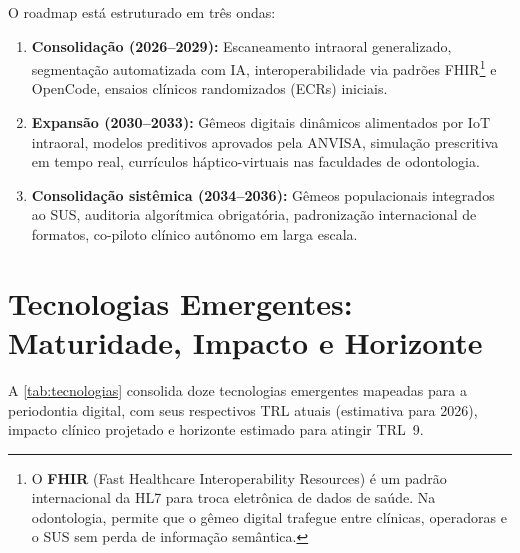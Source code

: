 O roadmap está estruturado em três ondas:
\begin{enumerate}[label=\textbf{Onda \arabic*:}, leftmargin=*]
    \item \textbf{Consolidação (2026--2029):} Escaneamento intraoral
        generalizado, segmentação automatizada com IA,
        interoperabilidade via padrões FHIR\footnote{O
        \textbf{FHIR} (Fast Healthcare Interoperability Resources)
        é um padrão internacional da HL7 para troca eletrônica de
        dados de saúde. Na odontologia, permite que o gêmeo digital
        trafegue entre clínicas, operadoras e o SUS sem perda de
        informação semântica.} e OpenCode, ensaios clínicos
        randomizados (ECRs) iniciais.
    \item \textbf{Expansão (2030--2033):} Gêmeos digitais dinâmicos
        alimentados por IoT intraoral, modelos preditivos
        aprovados pela ANVISA, simulação prescritiva em tempo
        real, currículos háptico-virtuais nas faculdades de
        odontologia.
    \item \textbf{Consolidação sistêmica (2034--2036):} Gêmeos
        populacionais integrados ao SUS, auditoria algorítmica
        obrigatória, padronização internacional de formatos,
        co-piloto clínico autônomo em larga escala.
\end{enumerate}


\section{Tecnologias Emergentes: Maturidade, Impacto e Horizonte}

A \autoref{tab:tecnologias} consolida doze tecnologias emergentes
mapeadas para a periodontia digital, com seus respectivos TRL
atuais (estimativa para 2026), impacto clínico projetado e
horizonte estimado para atingir TRL~9.

